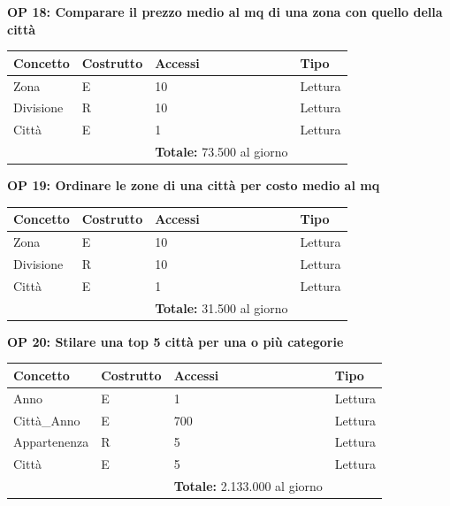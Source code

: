 \documentclass[a4paper,12pt]{report}
\begin{document}
            \textbf{OP 18: Comparare il prezzo medio al mq di una zona con quello della città}
        	\begin{table}[H]
            \centering
             \begin{tabular}{llll}
             \rowcolor{yellow!20} \textbf{Concetto} & \textbf{Costrutto} & \textbf{Accessi} & \textbf{Tipo}\\ [0.5ex] 
             \hline
             Zona & E & 10 & Lettura \\ 
             Divisione & R & 10 & Lettura \\ 
             Città & E & 1 & Lettura \\ 
             \hline
                \rowcolor{yellow!20} &   & \textbf{Totale:}  73.500 al giorno &  \\ [1ex] 
             
             \end{tabular}
            \end{table}

            \textbf{OP 19: Ordinare le zone di una città per costo medio al mq}
        	\begin{table}[H]
            \centering
             \begin{tabular}{llll}
             \rowcolor{yellow!20} \textbf{Concetto} & \textbf{Costrutto} & \textbf{Accessi} & \textbf{Tipo}\\ [0.5ex] 
             \hline
             Zona & E & 10 & Lettura \\ 
             Divisione & R & 10 & Lettura \\ 
             Città & E & 1 & Lettura \\ 
             \hline
                \rowcolor{yellow!20} &   & \textbf{Totale:}  31.500 al giorno &  \\ [1ex] 
             
             \end{tabular}
            \end{table}

            \textbf{OP 20: Stilare una top 5 città per una o più categorie}
        	\begin{table}[H]
            \centering
             \begin{tabular}{llll}
             \rowcolor{yellow!20} \textbf{Concetto} & \textbf{Costrutto} & \textbf{Accessi} & \textbf{Tipo}\\ [0.5ex] 
             \hline
             Anno & E & 1 & Lettura \\ 
             Città\_Anno & E & 700 & Lettura \\ 
             Appartenenza & R & 5 & Lettura \\ 
             Città & E & 5 & Lettura \\ 
             \hline
                \rowcolor{yellow!20} &   & \textbf{Totale:}  2.133.000 al giorno &  \\ [1ex] 
             
             \end{tabular}
            \end{table}
\end{document}
